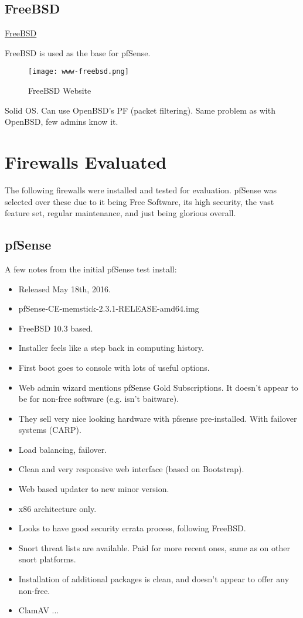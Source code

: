 \subsection{FreeBSD}
 \href{https://www.freebsd.org/}{FreeBSD}

FreeBSD is used as the base for pfSense.

\begin{figure}[h!]
\texttt{[image: www-freebsd.png]}
 \caption{FreeBSD Website}
 \label{fig:www-freebsd}
\end{figure}

Solid OS. Can use OpenBSD's PF (packet filtering). Same problem as with
OpenBSD, few admins know it.


\section{Firewalls Evaluated}
The following firewalls were installed and tested for evaluation. pfSense was
selected over these due to it being Free Software, its high security, the vast
feature set, regular maintenance, and just being glorious overall.

\subsection{pfSense}

A few notes from the initial pfSense test install:

\begin{itemize}
 \item Released May 18th, 2016.
 \item pfSense-CE-memstick-2.3.1-RELEASE-amd64.img
 \item FreeBSD 10.3 based.
 \item Installer feels like a step back in computing history.
 \item First boot goes to console with lots of useful options.
 \item Web admin wizard mentions pfSense Gold Subscriptions. It doesn't appear to be for non-free software (e.g. isn't baitware).
 \item They sell very nice looking hardware with pfsense pre-installed. With failover systems (CARP).
 \item Load balancing, failover.
 \item Clean and very responsive web interface (based on Bootstrap).
 \item Web based updater to new minor version.
 \item x86 architecture only.
 \item Looks to have good security errata process, following FreeBSD.
 \item Snort threat lists are available. Paid for more recent ones, same as on other snort platforms.
 \item Installation of additional packages is clean, and doesn't appear to offer any non-free.
 \item ClamAV ...
\end{itemize}


